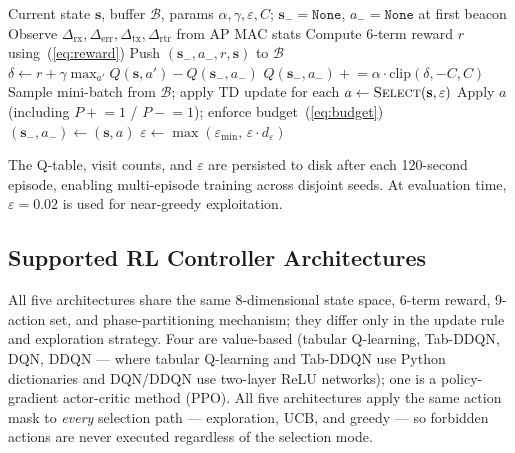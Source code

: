 \documentclass[conference]{IEEEtran}
\begin{document}
\begin{algorithm}[t]
\caption{RL-RAW v8: per-beacon Q-learning update}
\label{alg:rl}
\begin{algorithmic}[1]
\Require Current state $\mathbf{s}$, buffer $\mathcal{B}$,
         params $\alpha, \gamma, \varepsilon, C$;
         $\mathbf{s}_-=\mathtt{None}$, $a_-=\mathtt{None}$ at first beacon
\State Observe $\Delta_\text{rx}, \Delta_\text{err}, \Delta_\text{tx},
       \Delta_\text{rtr}$ from AP MAC stats
\State Compute 6-term reward $r$ using~(\ref{eq:reward})
    \State Push $(\mathbf{s}_-, a_-, r, \mathbf{s})$ to $\mathcal{B}$
  \EndIf
  \State $\delta \gets r + \gamma \max_{a'} Q(\mathbf{s}, a') - Q(\mathbf{s}_-, a_-)$
  \State $Q(\mathbf{s}_-, a_-) \mathrel{+}= \alpha \cdot \text{clip}(\delta, -C, C)$
    \State Sample mini-batch from $\mathcal{B}$; apply TD update for each
  \EndFor
\EndIf
\State $a \leftarrow \textsc{Select}(\mathbf{s}, \varepsilon)$
\State Apply $a$ (including $P \mathrel{+}= 1$ / $P \mathrel{-}= 1$);
       enforce budget~(\ref{eq:budget})
\State $(\mathbf{s}_-, a_-) \leftarrow (\mathbf{s}, a)$
  \State $\varepsilon \leftarrow \max(\varepsilon_\text{min},\, \varepsilon \cdot d_\varepsilon)$
\EndIf
\end{algorithmic}
\end{algorithm}

The Q-table, visit counts, and $\varepsilon$ are persisted to disk after each
120-second episode, enabling multi-episode training across disjoint seeds.
At evaluation time, $\varepsilon = 0.02$ is used for near-greedy exploitation.

\subsection{Supported RL Controller Architectures}

All five architectures share the same 8-dimensional state space, 6-term
reward, 9-action set, and phase-partitioning mechanism; they differ only in
the update rule and exploration strategy.
Four are value-based (tabular Q-learning, Tab-DDQN, DQN, DDQN — where
tabular Q-learning and Tab-DDQN use Python dictionaries and DQN/DDQN use
two-layer ReLU networks); one is a policy-gradient actor-critic method (PPO).
All five architectures apply the same action mask to \emph{every} selection
path — exploration, UCB, and greedy — so forbidden actions are never executed
regardless of the selection mode.
\end{document}
